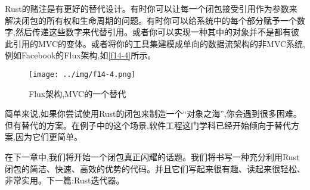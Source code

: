 Rust的赌注是有更好的替代设计。有时你可以让每一个闭包接受引用作为参数来解决闭包的所有权和生命周期的问题。有时你可以给系统中的每个部分赋予一个数字,然后传递这些数字来代替引用。或者你可以实现一种其中的对象并不是都有彼此引用的MVC的变体。或者将你的工具集建模成单向的数据流架构的非MVC系统,例如Facebook的Flux架构,如\autoref{f14-4}所示。

\begin{figure}[htbp]
    \centering
    \texttt{[image: ../img/f14-4.png]}
    \caption{Flux架构,MVC的一个替代}
    \label{f14-4}
\end{figure}

简单来说,如果你尝试使用Rust的闭包来制造一个“对象之海”,你会遇到很多困难。但有替代的方案。在例子中的这个场景,软件工程这门学科已经开始倾向于替代方案,因为它们更简单。

在下一章中,我们将开始一个闭包真正闪耀的话题。我们将书写一种充分利用Rust闭包的简洁、快速、高效的优势的代码。并且它们写起来很有趣、读起来很轻松、非常实用。下一篇:Rust迭代器。
